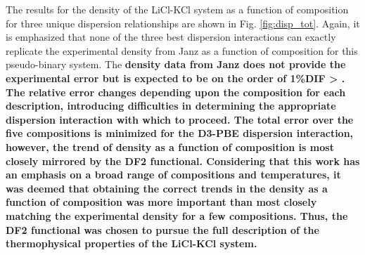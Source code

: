 \documentclass[review]{elsarticle}
\providecommand{\DIFaddtex}[1]{{\bf #1}} %
\providecommand{\DIFdeltex}[1]{} %
\providecommand{\DIFaddbegin}{\protect\color{blue}} %
\providecommand{\DIFaddend}{\protect\color{black}} %
\providecommand{\DIFdelbegin}{\protect\color{red}} %
\providecommand{\DIFdelend}{\protect\color{black}} %
\providecommand{\DIFadd}[1]{\texorpdfstring{\DIFaddtex{#1}}{#1}} %
\providecommand{\DIFdel}[1]{\texorpdfstring{\DIFdeltex{#1}}{}} %
\newcommand{\DIFscaledelfig}{0.5}
\newlength{\DIFdelgraphicswidth} %
\newlength{\DIFdelgraphicsheight} %
\newcommand{\DIFaddincludegraphics}[2][]{{\color{blue}\fbox{\DIFOincludegraphics[#1]{#2}}}} %
\newcommand{\DIFdelincludegraphics}[2][]{%
\sbox{\DIFdelgraphicsbox}{\DIFOincludegraphics[#1]{#2}}%
\settoboxwidth{\DIFdelgraphicswidth}{\DIFdelgraphicsbox} %
\settoboxtotalheight{\DIFdelgraphicsheight}{\DIFdelgraphicsbox} %
\scalebox{\DIFscaledelfig}{%
\parbox[b]{\DIFdelgraphicswidth}{\usebox{\DIFdelgraphicsbox}\\[-\baselineskip] \rule{\DIFdelgraphicswidth}{0em}}\llap{\resizebox{\DIFdelgraphicswidth}{\DIFdelgraphicsheight}{%
\setlength{\unitlength}{\DIFdelgraphicswidth}%
\begin{picture}(1,1)%
\thicklines\linethickness{2pt} %
{\color[rgb]{1,0,0}\put(0,0){\framebox(1,1){}}}%
{\color[rgb]{1,0,0}\put(0,0){\line( 1,1){1}}}%
{\color[rgb]{1,0,0}\put(0,1){\line(1,-1){1}}}%
\end{picture}%
}\hspace*{3pt}}} %
} %
\DeclareRobustCommand{\DIFaddbegin}{\DIFOaddbegin \let\includegraphics\DIFaddincludegraphics} %
\DeclareRobustCommand{\DIFaddend}{\DIFOaddend \let\includegraphics\DIFOincludegraphics} %
\DeclareRobustCommand{\DIFdelbegin}{\DIFOdelbegin \let\includegraphics\DIFdelincludegraphics} %
\DeclareRobustCommand{\DIFdelend}{\DIFOaddend \let\includegraphics\DIFOincludegraphics} %
\begin{document}
The results for the density of the LiCl-KCl system as a function of composition for three unique dispersion relationships are shown in Fig. \ref{fig:disp_tot}. Again, it is emphasized that none of the three best dispersion interactions can exactly replicate the experimental density from Janz as a function of composition for this pseudo-binary system. The \DIFdelbegin \DIFdel{relative error changes depending upon the composition for each description, introducing difficulties in determining the appropriate dispersion interaction with which to proceed. The total error over the five compositions is minimized for the D3-PBE dispersion interaction, however, the trend of density as a function of composition is most closely mirrored by the DF2 functional. Considering that this work has an emphasis on a broad range of compositions and temperatures, it was deemed that obtaining the correct trends in the density as a function of composition was more important than most closely matching the experimental density for a few compositions. Thus, the DF2 functional was chosen to pursue the full description of the thermophysical properties of the LiCl-KCl system. 
}\DIFdelend \DIFaddbegin \DIFadd{density data from Janz does not provide the experimental error but is expected to be on the order of 1\%DIF > . The relative error changes depending upon the composition for each description, introducing difficulties in determining the appropriate dispersion interaction with which to proceed. The total error over the five compositions is minimized for the D3-PBE dispersion interaction, however, the trend of density as a function of composition is most closely mirrored by the DF2 functional. Considering that this work has an emphasis on a broad range of compositions and temperatures, it was deemed that obtaining the correct trends in the density as a function of composition was more important than most closely matching the experimental density for a few compositions. Thus, the DF2 functional was chosen to pursue the full description of the thermophysical properties of the LiCl-KCl system. 
}\DIFaddend 
\end{document}
